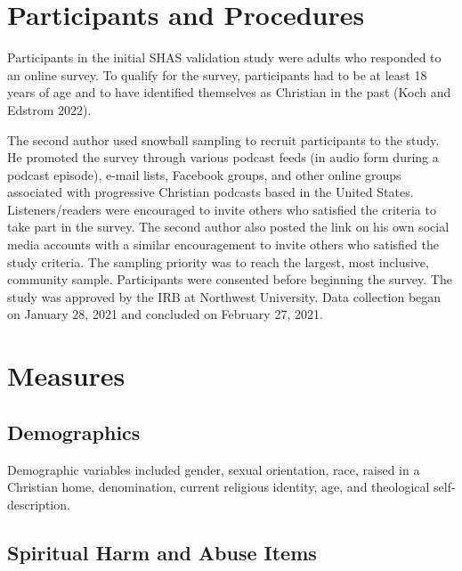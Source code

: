\documentclass[
  letterpaper,
  DIV=11,
  numbers=noendperiod]{scrreport}
\begin{document}
\hypertarget{participants-and-procedures}{%
\section*{Participants and
Procedures}\label{participants-and-procedures}}

Participants in the initial SHAS validation study were adults who
responded to an online survey. To qualify for the survey, participants
had to be at least 18 years of age and to have identified themselves as
Christian in the past (Koch and Edstrom 2022).

The second author used snowball sampling to recruit participants to the
study. He promoted the survey through various podcast feeds (in audio
form during a podcast episode), e-mail lists, Facebook groups, and other
online groups associated with progressive Christian podcasts based in
the United States. Listeners/readers were encouraged to invite others
who satisfied the criteria to take part in the survey. The second author
also posted the link on his own social media accounts with a similar
encouragement to invite others who satisfied the study criteria. The
sampling priority was to reach the largest, most inclusive, community
sample. Participants were consented before beginning the survey. The
study was approved by the IRB at Northwest University. Data collection
began on January 28, 2021 and concluded on February 27, 2021.

\hypertarget{measures}{%
\section*{Measures}\label{measures}}

\hypertarget{demographics}{%
\subsection*{Demographics}\label{demographics}}

Demographic variables included gender, sexual orientation, race, raised
in a Christian home, denomination, current religious identity, age, and
theological self-description.

\hypertarget{spiritual-harm-and-abuse-items}{%
\subsection*{Spiritual Harm and Abuse
Items}\label{spiritual-harm-and-abuse-items}}
\end{document}
